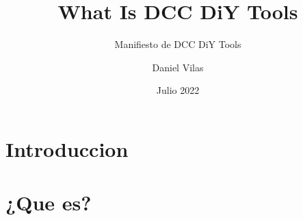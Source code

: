 \documentclass[spanish]{DccDiyTools/DccDiyTools}
\title{What Is DCC DiY Tools}
\subtitle{Manifiesto de DCC DiY Tools}
\author{Daniel Vilas}
\date{Julio 2022}
\begin{document}
\maketitle
\newpage
\section{Introduccion}


\newpage
\section{¿Que es?}

\end{document}
